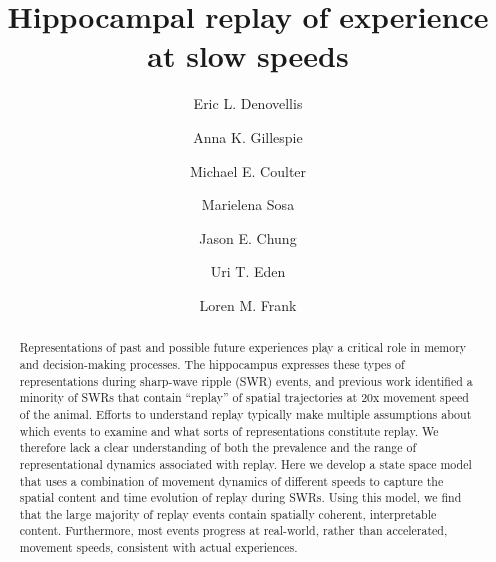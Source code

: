 \documentclass[9pt,lineno]{elife}
\begin{document}
\title{Hippocampal replay of experience at slow speeds}

\author[1, 2, 3]{Eric L. Denovellis}
\author[2, 3]{Anna K. Gillespie}
\author[2, 3]{Michael E. Coulter}
\author[4]{Marielena Sosa}
\author[5]{Jason E. Chung}
\author[6]{Uri T. Eden}
\author[1, 2, 3]{Loren M. Frank}



\maketitle

\begin{abstract}
Representations of past and possible future experiences play a critical role in memory and decision-making processes. The hippocampus expresses these types of representations during sharp-wave ripple (SWR) events, and previous work identified a minority of SWRs that contain “replay” of spatial trajectories at \texttildelow20x movement speed of the animal. Efforts to understand replay typically make multiple assumptions about which events to examine and what sorts of representations constitute replay. We therefore lack a clear understanding of both the prevalence and the range of representational dynamics associated with replay. Here we develop a state space model that uses a combination of movement dynamics of different speeds to capture the spatial content and time evolution of replay during SWRs. Using this model, we find that the large majority of replay events contain spatially coherent, interpretable content. Furthermore, most events progress at real-world, rather than accelerated, movement speeds, consistent with actual experiences. 
\end {abstract}
\end{document}
